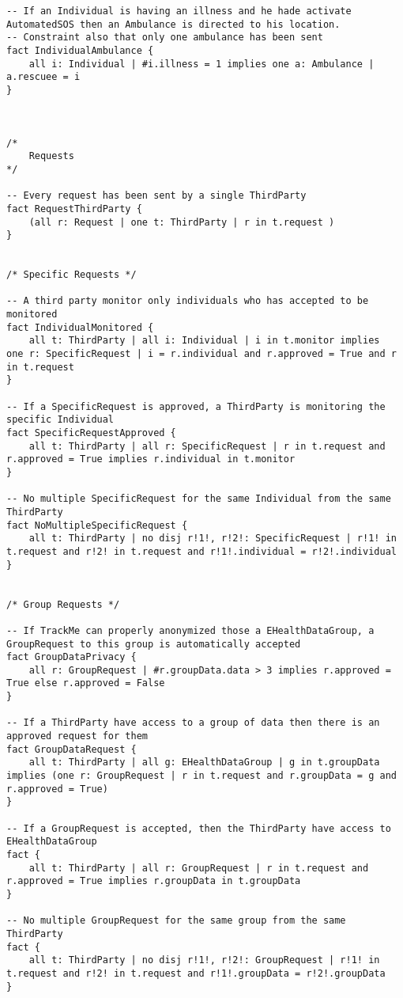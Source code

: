 \begin{lstlisting}
-- If an Individual is having an illness and he hade activate AutomatedSOS then an Ambulance is directed to his location.
-- Constraint also that only one ambulance has been sent
fact IndividualAmbulance {
	all i: Individual | #i.illness = 1 implies one a: Ambulance | a.rescuee = i
}



/*
	Requests
*/

-- Every request has been sent by a single ThirdParty
fact RequestThirdParty {
	(all r: Request | one t: ThirdParty | r in t.request ) 
}


/* Specific Requests */

-- A third party monitor only individuals who has accepted to be monitored
fact IndividualMonitored {
	all t: ThirdParty | all i: Individual | i in t.monitor implies 		one r: SpecificRequest | i = r.individual and r.approved = True and r in t.request
}

-- If a SpecificRequest is approved, a ThirdParty is monitoring the specific Individual
fact SpecificRequestApproved {
	all t: ThirdParty | all r: SpecificRequest | r in t.request and r.approved = True implies r.individual in t.monitor
}

-- No multiple SpecificRequest for the same Individual from the same ThirdParty
fact NoMultipleSpecificRequest {
	all t: ThirdParty | no disj r!1!, r!2!: SpecificRequest | r!1! in t.request and r!2! in t.request and r!1!.individual = r!2!.individual
}


/* Group Requests */

-- If TrackMe can properly anonymized those a EHealthDataGroup, a GroupRequest to this group is automatically accepted
fact GroupDataPrivacy {
	all r: GroupRequest | #r.groupData.data > 3 implies r.approved = True else r.approved = False
}

-- If a ThirdParty have access to a group of data then there is an approved request for them
fact GroupDataRequest {
	all t: ThirdParty | all g: EHealthDataGroup | g in t.groupData implies (one r: GroupRequest | r in t.request and r.groupData = g and r.approved = True)
}

-- If a GroupRequest is accepted, then the ThirdParty have access to EHealthDataGroup
fact {
	all t: ThirdParty | all r: GroupRequest | r in t.request and r.approved = True implies r.groupData in t.groupData
}

-- No multiple GroupRequest for the same group from the same ThirdParty
fact {
	all t: ThirdParty | no disj r!1!, r!2!: GroupRequest | r!1! in t.request and r!2! in t.request and r!1!.groupData = r!2!.groupData
}





\end{lstlisting}
